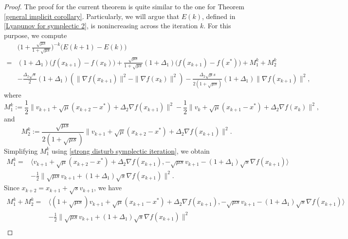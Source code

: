 \documentclass[11pt]{article}
\newcommand{\1}{\mathbf 1}
\numberwithin{equation}{section}
\begin{document}
\begin{proof}
The proof for the current theorem is quite similar to the one for Theorem  \ref{general implicit corollary}. Particularly, we will argue that $E(k)$, defined in  \eqref{Lyapunov for symplectic 2}, is nonincreasing across the iteration $k$. For this purpose, we compute
    \begin{equation}
        \label{eq: diffEk in direct symplectic discretization}
        \begin{aligned}
            &\Big(1+\frac{\sqrt{\mu s}}{1+\sqrt{\mu s}}\Big)^{-k} \big( E(k+1)-E(k)\big)\\
            =&(1+\Delta_1)\big(f(x_{k+1})-f(x_k)\big)+\frac{\sqrt{\mu s}}{1+\sqrt{\mu s}}(1+\Delta_1)\big(f(x_{k+1})-f(x^*)\big)+M_1^k+M_2^k\\
            &-\frac{\Delta_2\sqrt{s}}{2}(1+\Delta_1)(\|\nabla f(x_{k+1})\|^2-\|\nabla f(x_k)\|^2)-\frac{\Delta_2\sqrt{\mu}s}{2(1+\sqrt{\mu s})}(1+\Delta_1)\|\nabla f(x_{k+1})\|^2,
        \end{aligned}
    \end{equation}
    where
    \begin{equation*}
        M_1^k := \frac{1}{2}\|v_{k+1}+\sqrt{\mu}(x_{k+2}-x^*)+\Delta_2\nabla f(x_{k+1})\|^2-\frac{1}{2}\|v_k+\sqrt{\mu}(x_{k+1}-x^*)+\Delta_2\nabla f(x_k)\|^2,
    \end{equation*}
    and
    \begin{equation*}
        M_2^k := \frac{\sqrt{\mu s}}{2(1+\sqrt{\mu s})}\|v_{k+1}+\sqrt{\mu}(x_{k+2}-x^*)+\Delta_2\nabla f(x_{k+1})\|^2.
    \end{equation*} 
    Simplifying $M_1^k$ using \eqref{strong disturb symplectic iteration}, we obtain
    \begin{align*}
    M_1^k
        =&\langle v_{k+1}+\sqrt{\mu}(x_{k+2}-x^*)+\Delta_2\nabla f(x_{k+1}), -\sqrt{\mu s}v_{k+1}-(1+\Delta_1)\sqrt{s}\nabla f(x_{k+1}) \rangle\\
            &-\frac{1}{2}\|\sqrt{\mu s}v_{k+1}+(1+\Delta_1)\sqrt{s}\nabla f(x_{k+1})\|^2.
    \end{align*}
    Since $x_{k+2}=x_{k+1}+\sqrt{s}v_{k+1}$, we have
    \begin{align*}
        M_1^k+M_2^k=&\langle (1+\sqrt{\mu s})v_{k+1}+\sqrt{\mu}(x_{k+1}-x^*)+\Delta_2\nabla f(x_{k+1}), -\sqrt{\mu s}v_{k+1}-(1+\Delta_1)\sqrt{s}\nabla f(x_{k+1}) \rangle\\
            &-\frac{1}{2}\|\sqrt{\mu s}v_{k+1}+(1+\Delta_1)\sqrt{s}\nabla f(x_{k+1})\|^2\\

\end{align*}
\end{proof}
\end{document}
